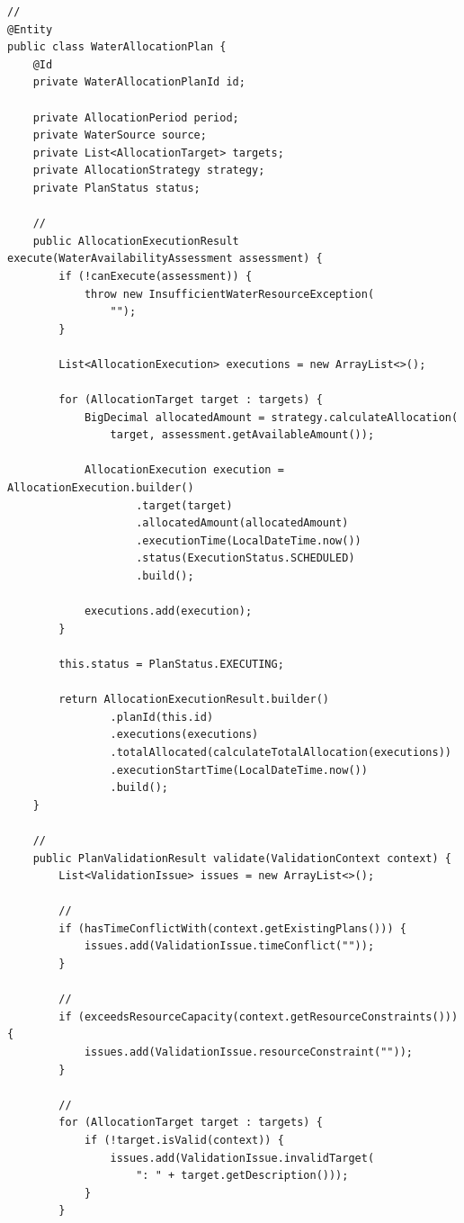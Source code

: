 \begin{lstlisting}[style=java]
// 
@Entity
public class WaterAllocationPlan {
    @Id
    private WaterAllocationPlanId id;
    
    private AllocationPeriod period;
    private WaterSource source;
    private List<AllocationTarget> targets;
    private AllocationStrategy strategy;
    private PlanStatus status;
    
    // 
    public AllocationExecutionResult execute(WaterAvailabilityAssessment assessment) {
        if (!canExecute(assessment)) {
            throw new InsufficientWaterResourceException(
                "");
        }
        
        List<AllocationExecution> executions = new ArrayList<>();
        
        for (AllocationTarget target : targets) {
            BigDecimal allocatedAmount = strategy.calculateAllocation(
                target, assessment.getAvailableAmount());
                
            AllocationExecution execution = AllocationExecution.builder()
                    .target(target)
                    .allocatedAmount(allocatedAmount)
                    .executionTime(LocalDateTime.now())
                    .status(ExecutionStatus.SCHEDULED)
                    .build();
                    
            executions.add(execution);
        }
        
        this.status = PlanStatus.EXECUTING;
        
        return AllocationExecutionResult.builder()
                .planId(this.id)
                .executions(executions)
                .totalAllocated(calculateTotalAllocation(executions))
                .executionStartTime(LocalDateTime.now())
                .build();
    }
    
    // 
    public PlanValidationResult validate(ValidationContext context) {
        List<ValidationIssue> issues = new ArrayList<>();
        
        // 
        if (hasTimeConflictWith(context.getExistingPlans())) {
            issues.add(ValidationIssue.timeConflict(""));
        }
        
        // 
        if (exceedsResourceCapacity(context.getResourceConstraints())) {
            issues.add(ValidationIssue.resourceConstraint(""));
        }
        
        // 
        for (AllocationTarget target : targets) {
            if (!target.isValid(context)) {
                issues.add(ValidationIssue.invalidTarget(
                    ": " + target.getDescription()));
            }
        }
        

\end{lstlisting}
